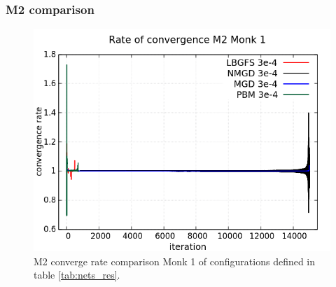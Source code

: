 \subsubsection{M2 comparison}
\begin{figure}[H]
	\centering
	\includegraphics[width=0.6\linewidth]{data/Comparison/Monk1/Monk1_M2_CR_standard.png}
	\caption{M2 converge rate comparison Monk 1 of configurations defined in table \ref{tab:nets_res}.}
	\label{fig:CR-M2-Monk1-Standard}
\end{figure}

